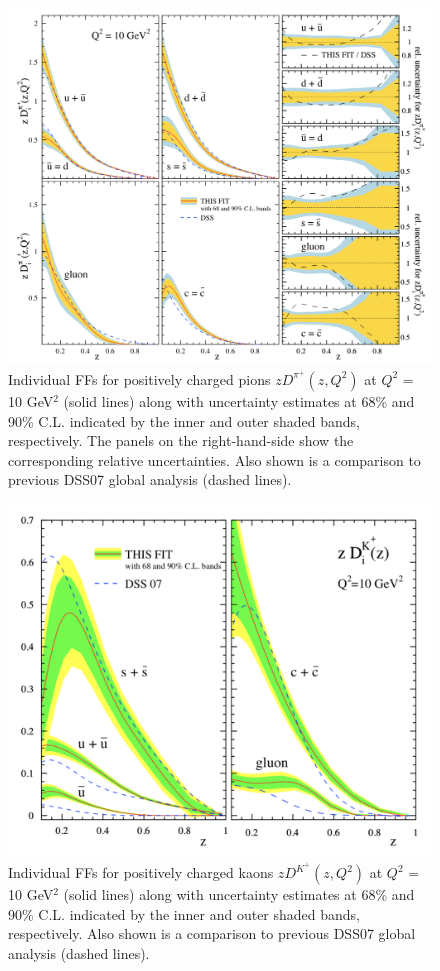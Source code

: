 \begin{figure}[!h]
  \centering
	\includegraphics[scale=0.47]{./gfx/DSEHSPi.png}
	\caption{Individual FFs for positively charged pions $zD^{\pi^+}(z,Q^2)$ at $Q^2$ = 10 GeV$^2$ (solid lines) along with uncertainty estimates at 68\% and 90\% C.L. indicated by the inner and outer shaded bands, respectively. The panels on the right-hand-side show the corresponding relative uncertainties. Also shown is a comparison to previous DSS07 global analysis\cite{DSS07} (dashed lines).}
	\label{pic:DSEHSPi}
\end{figure}

\begin{figure}[!h]
  \centering
	\includegraphics[scale=0.5]{./gfx/DSEHSK.png}
	\caption{Individual FFs for positively charged kaons $zD^{K^+}(z,Q^2)$ at $Q^2$ = 10 GeV$^2$ (solid lines) along with uncertainty estimates at 68\% and 90\% C.L. indicated by the inner and outer shaded bands, respectively. Also shown is a comparison to previous DSS07 global analysis\cite{DSS07} (dashed lines).}
	\label{pic:DSEHSK}
\end{figure}

